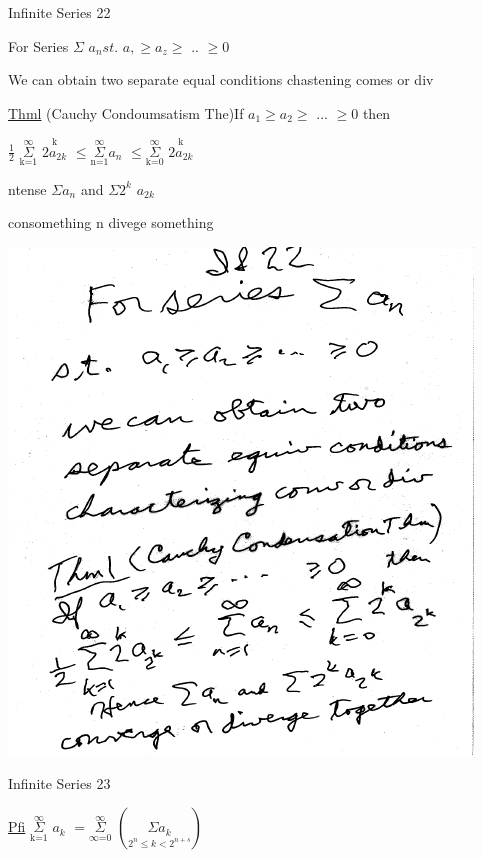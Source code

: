 \documentclass[10pt,a4paper]{article}
\begin{document}
{{\begin{center}

Infinite Series 22

For Series $\Sigma$ $a_{n} st.$ $a, \geq a_{z} \geq $ .. $\geq 0$ 

We can obtain two separate equal conditions chastening comes or div

{\underline {Thml}} (Cauchy Condoumsatism The)If $a_{1} \geq a_{2} \geq $ ... $\geq 0$ then

$\frac{1}{2}$ $\underset{\text{k=1}}{\overset{\text{$\infty$}}{\Sigma}}$ $\overset{\text{k}}{2a_{2k}}$ $\leq \underset{\text{n=1}}{\overset{\text{$\infty$}}{\Sigma}} {a_{n}}$ $\leq \underset{\text{k=0}}{\overset{\text{$\infty$}}{\Sigma}}$ $\overset{\text{k}}{2a_{2k}}$

ntense $\Sigma a_{n}$ and $\Sigma 2^{k}$ $a_{2k}$

consomething n divege something

\includegraphics[scale=.7]{Pages/IS_22}

\end{center}

\newpage %

\begin{center}

Infinite Series 23

\underline{Pfi} $\underset{\text{k=1}}{\overset{\text{$\infty$}}{\Sigma}}$ ${a_{k}}$ $= \underset{\text{$\infty$=0}}{\overset{\text{$\infty$}}{\Sigma}}$
$({\underset{\text{$2^{n}\leq k < 2^{n+s}$}}{\Sigma a_{k}}})$


\end{center}}}
\end{document}
